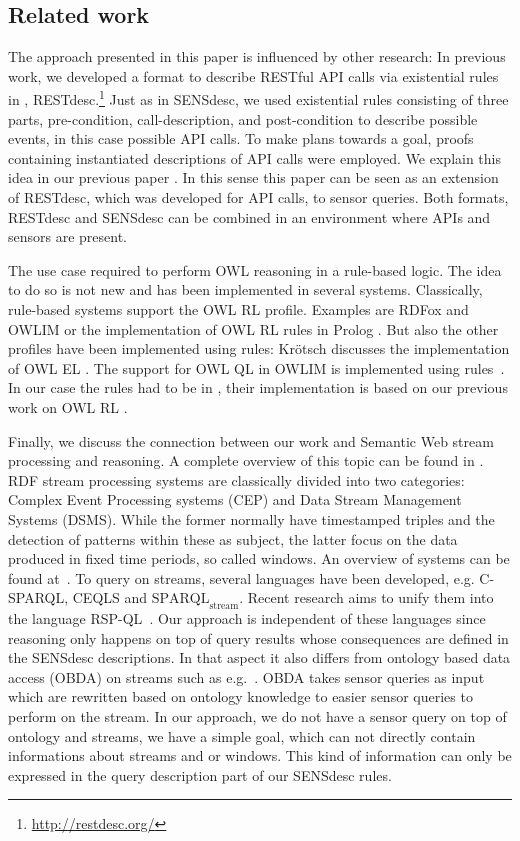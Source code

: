 \subsection{Related work}\label{rel}
The approach presented in this paper is influenced by other research:
In previous work, we developed a format to describe RESTful API calls via existential rules in \nthree, RESTdesc.\footnote{\url{http://restdesc.org/}}
Just as in SENSdesc, we used existential rules consisting of three parts, pre-condition, call-description, and post-condition to describe possible events, in this case possible 
API calls.
To make plans towards a goal, proofs containing instantiated descriptions of API calls were employed. We explain this
idea in our previous paper \cite{pragmaticproof}. 
In this sense this paper can be seen as an extension of RESTdesc, which was developed for API calls, to sensor queries. Both formats, RESTdesc and SENSdesc 
can be combined in an environment where APIs and sensors are present.

The use case required to perform OWL reasoning in a rule-based logic.
The idea to do so is not new and has been implemented in several systems.
Classically, rule-based systems support the OWL RL profile. 
Examples are RDFox \cite{Nenov2015} and OWLIM \cite{owlim} or the implementation of OWL RL rules in Prolog \cite{owlrlinprolog}. 
But also the other profiles have been implemented using rules: Kr\"otsch discusses the implementation of OWL EL \cite{Krotzsch}. 
The support for OWL QL in OWLIM is implemented using rules~\cite{OWLIM2}.
In our case the rules had to be in \nthree, their implementation is based on our previous work on OWL RL \cite{arndt_ruleml_industry_2015,arndt_owled_2015}. 

Finally, we discuss the connection between our work and Semantic Web stream processing and reasoning. 
A complete overview of this topic can be found in \cite{streamreasoning}.
RDF stream processing systems are classically divided into two categories:
 Complex Event Processing systems (CEP) and Data Stream Management Systems (DSMS). 
 While the former normally have timestamped triples and the detection 
 of patterns within these as subject, the latter focus on the data produced in fixed time periods, so called windows. 
An overview of systems can be found at~\cite{streams}. 
To query on streams, 
several languages have been developed, e.g.  
C-SPARQL, CEQLS and $\text{SPARQL}_\text{stream}$. 
Recent research aims to unify them into the language RSP-QL~\cite{rspql-language}. 
Our approach is independent of these languages since reasoning only happens on top 
of query results whose consequences are defined in the SENSdesc descriptions. 
In that aspect it also differs from  ontology based data access (OBDA) on streams such as e.g.~\cite{obdaStream}. 
OBDA takes sensor queries as input which are rewritten based on ontology knowledge
to easier sensor queries to perform on the stream. 
In our approach, we do not have a sensor query on top of ontology and streams, 
we have a simple goal, which can not directly contain informations about streams and or windows. 
This kind of information can only be expressed in the query description part of our SENSdesc rules. 


